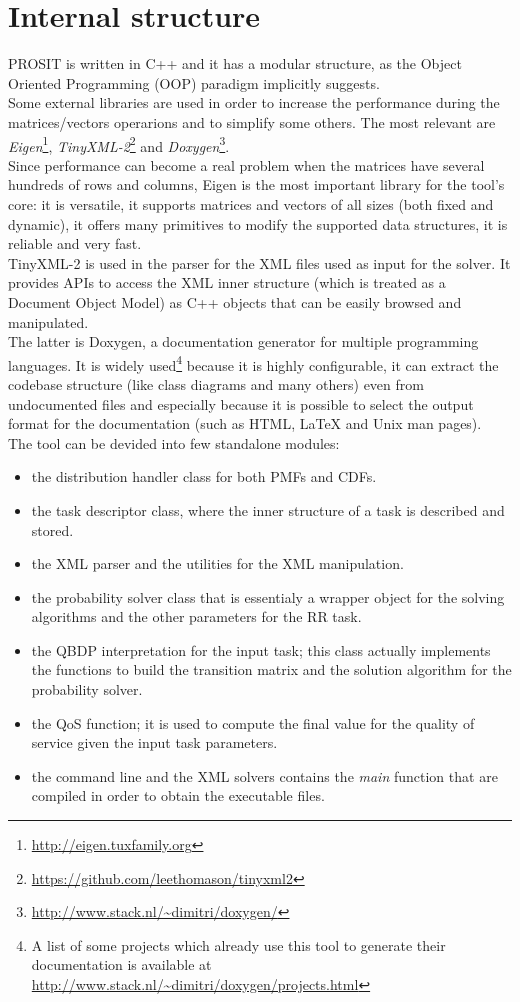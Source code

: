 \section{Internal structure}\label{structure}
PROSIT is written in C++ and it has a modular structure, as the Object Oriented Programming (OOP) paradigm implicitly suggests.\\
Some external libraries are used in order to increase the performance during the matrices/vectors operarions and to simplify some others. The most relevant are \emph{Eigen}\footnote{\url{http://eigen.tuxfamily.org}}, \emph{TinyXML-2}\footnote{\url{https://github.com/leethomason/tinyxml2}} and \emph{Doxygen}\footnote{\url{http://www.stack.nl/~dimitri/doxygen/}}.\\   
Since performance can become a real problem when the matrices have several hundreds of rows and columns, Eigen is the most important library for the tool's core: it is versatile, it supports matrices and vectors of all sizes (both fixed and dynamic), it offers many primitives to modify the supported data structures, it is reliable and very fast.\\
TinyXML-2 is used in the parser for the XML files used as input for the solver. It provides APIs to access the XML inner structure (which is treated as a Document Object Model) as C++ objects that can be easily browsed and manipulated.\\
The latter is Doxygen, a documentation generator for multiple programming languages. It is widely used\footnote{A list of some projects which already use this tool to generate their documentation is available at \url{http://www.stack.nl/~dimitri/doxygen/projects.html}} because it is highly configurable, it can extract the codebase structure (like class diagrams and many others) even from undocumented files and especially because it is possible to select the output format for the documentation (such as HTML, {\LaTeX} and Unix man pages).\\
The tool can be devided into few standalone modules:
\begin{itemize}
  \item the distribution handler class for both PMFs and CDFs.
  \item the task descriptor class, where the inner structure of a task is described and stored.
  \item the XML parser and the utilities for the XML manipulation.
  \item the probability solver class that is essentialy a wrapper object for the solving algorithms and the other parameters for the RR task.
  \item the QBDP interpretation for the input task; this class actually implements the functions to build the transition matrix and the solution algorithm for the probability solver.
  \item the QoS function; it is used to compute the final value for the quality of service given the input task parameters.
  \item the command line and the XML solvers contains the \emph{main} function that are compiled in order to obtain the executable files.
\end{itemize}

